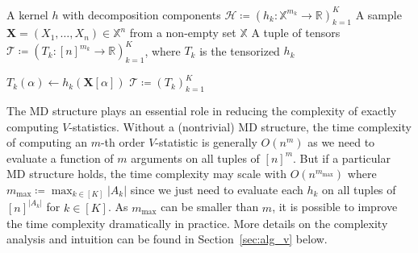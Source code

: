 \documentclass[sn-mathphys, natbib=false]{sn-jnl}
\theoremstyle{plain}
\theoremstyle{definition}
\newcommand{\samplespace}{\bbX}
\newcommand{\less}{O}
\newcommand{\Lin}[1]{{\color{purple}{#1}}}
\newcommand{\reals}{{\mathbb{R}}}
\def\bbX{\mathbb{X}}
\def\calT{\mathcal{T}}
\def\calH{\mathcal{H}}
\begin{document}
\begin{bibunit}[agsm]
\begin{algorithm}
    \caption{Tensorization of Kernel Function}
    \label{alg:tensorization}
    \begin{algorithmic}[1]
        \Require 
            \Statex A kernel $h$ with decomposition components $\calH \coloneqq (h_k: \bbX^{m_k} \to \reals)_{k=1}^K$
            \Statex A sample $\bm{X} = (X_1, \dots, X_n) \in \samplespace^n$ from a non-empty set $\samplespace$
        \Ensure A tuple of tensors $\calT \coloneqq (T_k: [n]^{m_k} \to \reals)_{k=1}^K$, where $T_k$ is the tensorized $h_k$

        \Function{Tensorization}{$\calH, \bm{X}$}
                    \State $T_k(\alpha) \gets h_k(\bm{X}[\alpha])$  
                \EndFor
            \EndFor
            \State \Return $\calT \coloneqq (T_k)_{k=1}^K$  
        \EndFunction
    \end{algorithmic}
\end{algorithm}


The MD structure plays an essential role in reducing the complexity of exactly computing $V$-statistics. %
Without a (nontrivial) MD structure, the time complexity of computing an $m$-th order $V$-statistic is generally $\less (n^m)$ as we need to evaluate a function of $m$ arguments on all tuples of $[n]^m$. But if a particular MD structure holds, the time complexity may scale with $\less (n^{m_{\mathrm{max}}})$ where $m_{\mathrm{max}} \coloneqq \max_{k \in [K]} |A_k|$ since we just need to evaluate each  $h_k$ on all tuples of $[n]^{|A_k|}$ for $k \in [K]$. As $m_{\mathrm{max}}$ can be smaller than $m$, it is possible to improve the time complexity dramatically in practice. More details on the complexity analysis and intuition can be found in Section~\ref{sec:alg_v} below.


\end{bibunit}
\end{document}
